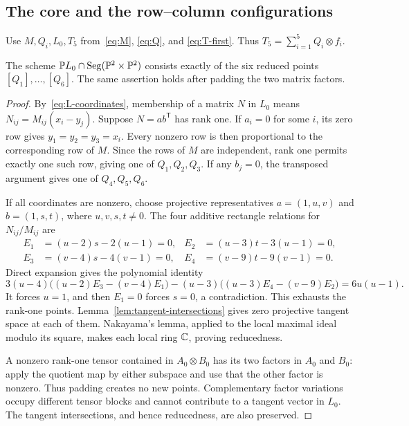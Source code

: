 \subsection{The core and the row--column configurations}

Use $M,Q_i,L_0,T_5$ from~\eqref{eq:M}, \eqref{eq:Q}, and
\eqref{eq:T-first}. Thus $T_5=\sum_{i=1}^5Q_i\otimes f_i$.

\begin{lemma}\label{norm:core}
The scheme $\mathbb P L_0\cap\operatorname{Seg}(\mathbb P^2\times\mathbb P^2)$ consists
exactly of the six reduced points $[Q_1],\ldots,[Q_6]$.
The same assertion holds after padding the two matrix factors.
\end{lemma}

\begin{proof}
By~\eqref{eq:L-coordinates}, membership of a matrix $N$ in $L_0$
means $N_{ij}=M_{ij}(x_i-y_j)$. Suppose $N=ab^{\mathsf T}$ has
rank one. If $a_i=0$ for some $i$, its zero row gives
$y_1=y_2=y_3=x_i$. Every nonzero row is then proportional to the
corresponding row of $M$. Since the rows of $M$ are independent,
rank one permits exactly one such row, giving one of $Q_1,Q_2,Q_3$.
If any $b_j=0$, the transposed argument gives one of
$Q_4,Q_5,Q_6$.

If all coordinates are nonzero, choose projective representatives
$a=(1,u,v)$ and $b=(1,s,t)$, where $u,v,s,t\ne0$.
The four additive rectangle relations for $N_{ij}/M_{ij}$ are
\begin{align*}
 E_1&=(u-2)s-2(u-1)=0,&
 E_2&=(u-3)t-3(u-1)=0,\\
 E_3&=(v-4)s-4(v-1)=0,&
 E_4&=(v-9)t-9(v-1)=0.
\end{align*}
Direct expansion gives the polynomial identity
\[
 3(u-4)\bigl((u-2)E_3-(v-4)E_1\bigr)
 -(u-3)\bigl((u-3)E_4-(v-9)E_2\bigr)=6u(u-1).
\]
It forces $u=1$, and then $E_1=0$ forces $s=0$, a contradiction.
This exhausts the rank-one points. Lemma~\ref{lem:tangent-intersections}
gives zero projective tangent space at each of them. Nakayama's
lemma, applied to the local maximal ideal modulo its square, makes
each local ring $\mathbb C$, proving reducedness.

A nonzero rank-one tensor contained in $A_0\otimes B_0$ has its
two factors in $A_0$ and $B_0$: apply the quotient map by either
subspace and use that the other factor is nonzero. Thus padding
creates no new points. Complementary factor variations occupy
different tensor blocks and cannot contribute to a tangent vector
in $L_0$. The tangent intersections, and hence reducedness, are
also preserved.
\end{proof}

